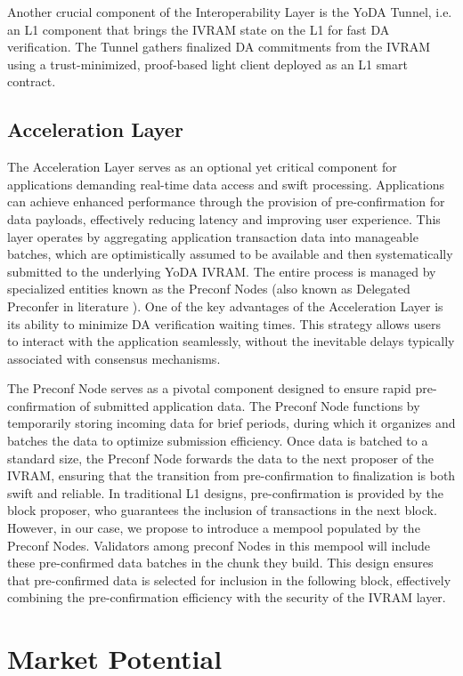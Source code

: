 \documentclass[11pt]{article}
\begin{document}
Another crucial component of the Interoperability Layer is the YoDA Tunnel, i.e. an L1 component that brings the IVRAM state on the L1 for fast DA verification. The Tunnel gathers finalized DA commitments from the IVRAM using a trust-minimized, proof-based light client deployed as an L1 smart contract.

\subsection{Acceleration Layer}
The Acceleration Layer serves as an optional yet critical component for applications demanding real-time data access and swift processing. Applications can achieve enhanced performance through the provision of pre-confirmation for data payloads, effectively reducing latency and improving user experience. This layer operates by aggregating application transaction data into manageable batches, which are optimistically assumed to be available and then systematically submitted to the underlying YoDA IVRAM. The entire process is managed by specialized entities known as the Preconf Nodes (also known as Delegated Preconfer in literature \cite{drake23}).
%
One of the key advantages of the Acceleration Layer is its ability to minimize DA verification waiting times. This strategy allows users to interact with the application seamlessly, without the inevitable delays typically associated with consensus mechanisms.

The Preconf Node serves as a pivotal component designed to ensure rapid pre-confirmation of submitted application data. The Preconf Node functions by temporarily storing incoming data for brief periods, during which it organizes and batches the data to optimize submission efficiency. Once data is batched to a standard size, the Preconf Node forwards the data to the next proposer of the IVRAM, ensuring that the transition from pre-confirmation to finalization is both swift and reliable.
%
In traditional L1 designs, pre-confirmation is provided by the block proposer, who guarantees the inclusion of transactions in the next block. However, in our case, we propose to introduce a mempool populated by the Preconf Nodes. Validators among preconf Nodes in this mempool will include these pre-confirmed data batches in the chunk they build. This design ensures that pre-confirmed data is selected for inclusion in the following block, effectively combining the pre-confirmation efficiency with the security of the IVRAM layer.

\section{Market Potential}
\end{document}
